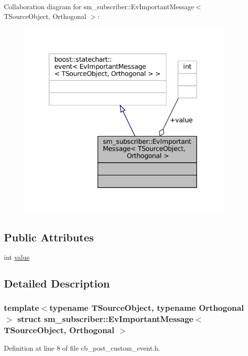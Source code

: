 Collaboration diagram for sm\+\_\+subscriber\+:\+:Ev\+Important\+Message$<$ T\+Source\+Object, Orthogonal $>$\+:
\nopagebreak
\begin{figure}[H]
\begin{center}
\leavevmode
\includegraphics[width=308pt]{structsm__subscriber_1_1EvImportantMessage__coll__graph}
\end{center}
\end{figure}
\subsection*{Public Attributes}
\begin{DoxyCompactItemize}
\item 
int \hyperlink{structsm__subscriber_1_1EvImportantMessage_af8ab5c9a95396460b4a3d2a8c9da5877}{value}
\end{DoxyCompactItemize}


\subsection{Detailed Description}
\subsubsection*{template$<$typename T\+Source\+Object, typename Orthogonal$>$\newline
struct sm\+\_\+subscriber\+::\+Ev\+Important\+Message$<$ T\+Source\+Object, Orthogonal $>$}



Definition at line 8 of file cb\+\_\+post\+\_\+custom\+\_\+event.\+h.



